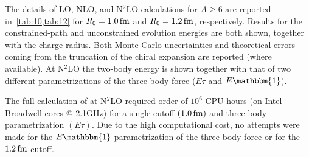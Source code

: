 \documentclass[aps,prc,twocolumn,superscriptaddress,floatfix]{revtex4-1}
\begin{document}
The details of LO, NLO, and N$^2$LO calculations for $A\ge6$ are reported in~\cref{tab:10,tab:12}
for $R_0=1.0\,\rm fm$ and $R_0=1.2\,\rm fm$, respectively. Results for the constrained-path and 
unconstrained evolution energies are both shown, together with the charge radius.
Both Monte Carlo uncertainties and theoretical errors coming from the truncation of the chiral 
expansion are reported (where available). At N$^2$LO the two-body energy is shown together with
that of two different parametrizations of the three-body force ($E\tau$ and $E\mathbbm{1}$).

The full calculation of  at N$^2$LO required 
order of $10^6$ CPU hours (on Intel Broadwell cores @ 2.1GHz) for a single cutoff $(1.0\,\rm fm)$ 
and three-body parametrization $(E\tau)$. Due to the high computational cost, no attempts were
made for the $E\mathbbm{1}$ parametrization of the three-body force or for the $1.2\,\rm fm$ cutoff.
\end{document}
